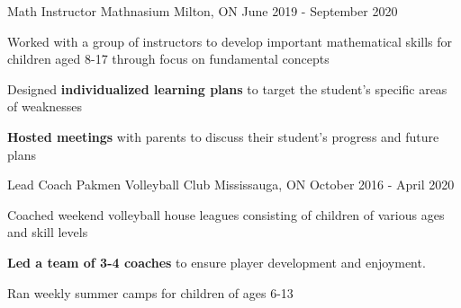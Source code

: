 
\begin{cventries}
  \cventry
    {Math Instructor} %
    {Mathnasium} %
    {Milton, ON} %
    {June 2019 - September 2020} %
    {
      \begin{cvitems} %
        \item {Worked with a group of instructors to develop important mathematical skills for children aged 8-17 through focus on fundamental concepts}
        \item {Designed \textbf{individualized learning plans} to target the student's specific areas of weaknesses}
        \item {\textbf{Hosted meetings} with parents to discuss their student's progress and future plans}
      \end{cvitems}
    }

  \cventry
    {Lead Coach} %
    {Pakmen Volleyball Club} %
    {Mississauga, ON} %
    {October 2016 - April 2020} %
    {
      \begin{cvitems} %
        \item {Coached weekend volleyball house leagues consisting of children of various ages and skill levels}
        \item {\textbf{Led a team of 3-4 coaches} to ensure player development and enjoyment.}
        \item {Ran weekly summer camps for children of ages 6-13}
      \end{cvitems}
    }

   
\end{cventries}
